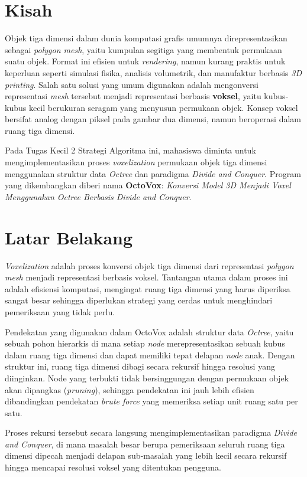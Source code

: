 \section{Kisah}

Objek tiga dimensi dalam dunia komputasi grafis umumnya direpresentasikan
sebagai \textit{polygon mesh}, yaitu kumpulan segitiga yang membentuk permukaan
suatu objek. Format ini efisien untuk \textit{rendering}, namun kurang praktis
untuk keperluan seperti simulasi fisika, analisis volumetrik, dan manufaktur
berbasis \textit{3D printing}. Salah satu solusi yang umum digunakan adalah
mengonversi representasi \textit{mesh} tersebut menjadi representasi berbasis
\textbf{voksel}, yaitu kubus-kubus kecil berukuran seragam yang menyusun
permukaan objek. Konsep voksel bersifat analog dengan piksel pada gambar dua
dimensi, namun beroperasi dalam ruang tiga dimensi.

Pada Tugas Kecil 2 Strategi Algoritma ini, mahasiswa diminta untuk
mengimplementasikan proses \textit{voxelization} permukaan objek tiga dimensi
menggunakan struktur data \textit{Octree} dan paradigma \textit{Divide and Conquer}.
Program yang dikembangkan diberi nama \textbf{OctoVox}: \textit{Konversi Model 3D
Menjadi Voxel Menggunakan Octree Berbasis Divide and Conquer}.

\section{Latar Belakang}

\textit{Voxelization} adalah proses konversi objek tiga dimensi dari representasi
\textit{polygon mesh} menjadi representasi berbasis voksel. Tantangan utama dalam
proses ini adalah efisiensi komputasi, mengingat ruang tiga dimensi yang harus
diperiksa sangat besar sehingga diperlukan strategi yang cerdas untuk menghindari
pemeriksaan yang tidak perlu.

Pendekatan yang digunakan dalam OctoVox adalah struktur data \textit{Octree},
yaitu sebuah pohon hierarkis di mana setiap \textit{node} merepresentasikan
sebuah kubus dalam ruang tiga dimensi dan dapat memiliki tepat delapan
\textit{node} anak. Dengan struktur ini, ruang tiga dimensi dibagi secara rekursif
hingga resolusi yang diinginkan. Node yang terbukti tidak bersinggungan dengan
permukaan objek akan dipangkas (\textit{pruning}), sehingga pendekatan ini jauh
lebih efisien dibandingkan pendekatan \textit{brute force} yang memeriksa setiap
unit ruang satu per satu.

Proses rekursi tersebut secara langsung mengimplementasikan paradigma
\textit{Divide and Conquer}, di mana masalah besar berupa pemeriksaan seluruh
ruang tiga dimensi dipecah menjadi delapan sub-masalah yang lebih kecil secara
rekursif hingga mencapai resolusi voksel yang ditentukan pengguna.

